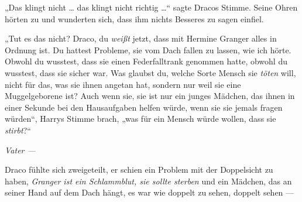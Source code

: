 „Das klingt nicht … das klingt nicht richtig …“ sagte Dracos Stimme. Seine Ohren hörten zu und wunderten sich, dass ihm nichts Besseres zu sagen einfiel.

„Tut es das nicht? Draco, du \emph{weißt} jetzt, dass mit Hermine Granger alles in Ordnung ist. Du hattest Probleme, sie vom Dach fallen zu lassen, wie ich hörte. Obwohl du wusstest, dass sie einen Federfalltrank genommen hatte, obwohl du wusstest, dass sie sicher war. Was glaubst du, welche Sorte Mensch sie \emph{töten} will, nicht für das, was sie ihnen angetan hat, sondern nur weil sie eine Muggelgeborene ist? Auch wenn sie, sie ist nur ein junges Mädchen, das ihnen in einer Sekunde bei den Hausaufgaben helfen würde, wenn sie sie jemals fragen würden“, Harrys Stimme brach, „was für ein Mensch würde wollen, dass sie \emph{stirbt}?“

\emph{Vater —}

Draco fühlte sich zweigeteilt, er schien ein Problem mit der Doppelsicht zu haben, \emph{Granger ist ein Schlammblut, sie sollte sterben} und ein Mädchen, das an seiner Hand auf dem Dach hängt, es war wie doppelt zu sehen, doppelt sehen —

